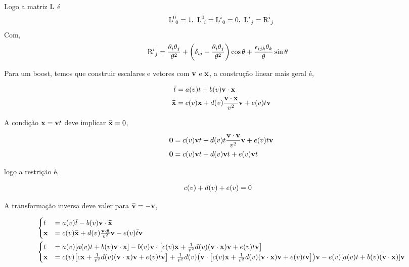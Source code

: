 \documentclass[twoside]{amsart}
\numberwithin{equation}{section}
\begin{document}
Logo a matriz $\textup L$ é $${\textup L}^{0}_{\ 0}=1,\ {\textup L}^0_{\ i}={\textup L}^{i}_{\ 0}=0,\ {\textup L}^{i}_{\ j}={\textup R}^{i}_{\ j}$$
Com,
\begin{align}
    {\textup R}^{i}_{\ j}&=\frac{\theta_i\theta_{j}}{\theta^2}+\qty(\delta_{ij}-\frac{\theta_{i}\theta_j}{\theta^2})\cos\theta+\frac{\epsilon_{ijk}\theta_k}{\theta}\sin\theta
\end{align}

Para um boost, temos que construir escalares e vetores com $\vb v$ e $\vb x$, a construção linear mais geral é,

\begin{align}
    {\bar t}&=a\qty(v)t+b\qty(v)\vb v\cdot \vb x\\
    \vb {\bar x}&=c\qty(v)\vb x+d\qty(v)\frac{\vb v\cdot \vb x}{v^2}\vb v+e\qty(v)t\vb v
\end{align}

A condição $\vb x=\vb v t$ deve implicar $\vb{\bar x}=0$, 

\begin{align}
    \vb 0&=c\qty(v)\vb v t+d\qty(v)t\frac{\vb v\cdot \vb v}{v^2}\vb v+e\qty(v)t\vb v\\
    \vb 0&=c\qty(v)\vb v t+d\qty(v)\vb v t+e\qty(v)\vb v t
\end{align}

logo a restrição é,

\begin{align}
    c\qty(v)+d\qty(v)+e\qty(v)&=0
\end{align}

A transformação inversa deve valer para $\vb {\bar v}=-\vb v$, 

\begin{align}
    &\begin{cases}
        {t}&=a\qty(v){\bar t}-b\qty(v)\vb v\cdot \vb{\bar x}\\
    \vb { x}&=c\qty(v)\vb{\bar x}+d\qty(v)\frac{\vb v\cdot \vb{\bar x}}{v^2}\vb v-e\qty(v){\bar t}\vb v
    \end{cases}\\
    &\begin{cases}
        {t}&=a\qty(v)\qty[a\qty(v)t+b\qty(v)\vb v\cdot \vb x]-b\qty(v)\vb v\cdot \qty[c\qty(v)\vb x+\frac{1}{v^2}d\qty(v)\qty(\vb v\cdot \vb x)\vb v+e\qty(v)t\vb v]\\
    \vb { x}&=c\qty(v)\qty[c\vb x+\frac{1}{v^2}d\qty(v)\qty(\vb v\cdot\vb x)\vb v+e\qty(v)t\vb v]+\frac{1}{v^2}d\qty(v)\qty(\vb v\cdot \qty[c\qty(v)\vb x+\frac{1}{v^2}d\qty(v)\qty(\vb v\cdot \vb x)\vb v+e\qty(v)t\vb v])\vb v-e\qty(v)\qty[a\qty(v)t+b\qty(v)\qty(\vb v\cdot\vb x)]\vb v
    \end{cases}
\end{align}
\end{document}
